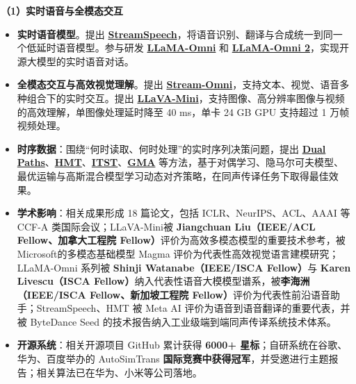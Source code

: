 \documentclass{resume}
\begin{document}

\vspace{2mm}

\textbf{\large \textcolor{red1}{（1）实时语音与全模态交互}}
\begin{itemize}[parsep=0.3ex]
\item \textbf{实时语音模型}。提出 \textbf{\href{https://arxiv.org/abs/2406.03049}{StreamSpeech}}，将语音识别、翻译与合成统一到同一个低延时语音模型。参与研发 \textbf{\href{https://arxiv.org/abs/2409.06666}{LLaMA-Omni}} 和 \textbf{\href{https://arxiv.org/abs/2505.02625}{LLaMA-Omni 2}}，实现开源大模型的实时语音对话。

\item \textbf{全模态交互与高效视觉理解}。提出 \textbf{\href{https://arxiv.org/pdf/2506.13642}{Stream-Omni}}，支持文本、视觉、语音多种组合下的实时交互。提出 \textbf{\href{https://arxiv.org/abs/2501.03895}{LLaVA-Mini}}，支持图像、高分辨率图像与视频的高效理解，单图像处理延时降至 40 ms，单卡 24 GB GPU 支持超过 1 万帧视频处理。

\item \textbf{时序数据}：围绕“何时读取、何时处理”的实时序列决策问题，提出 \textbf{\href{https://aclanthology.org/2022.acl-long.176/}{Dual Paths}}、\textbf{\href{https://openreview.net/forum?id=9y0HFvaAYD6}{HMT}}、\textbf{\href{https://aclanthology.org/2022.emnlp-main.65/}{ITST}}、\textbf{\href{https://aclanthology.org/2021.findings-emnlp.121/}{GMA}} 等方法，基于对偶学习、隐马尔可夫模型、最优运输与高斯混合模型学习动态对齐策略，在同声传译任务下取得最佳效果。

\item \textbf{\textcolor{red2}{学术影响}}：相关成果形成 18 篇论文，包括 ICLR、NeurIPS、ACL、AAAI 等 CCF-A 类国际会议；LLaVA-Mini被 \textbf{Jiangchuan Liu（IEEE/ACL Fellow、加拿大工程院 Fellow）}评价为高效多模态模型的重要技术参考，被Microsoft的多模态基础模型 Magma 评价为代表性高效视觉语言建模研究；LLaMA-Omni 系列被 \textbf{Shinji Watanabe（IEEE/ISCA Fellow）}与 \textbf{Karen Livescu（ISCA Fellow）}纳入代表性语音大模模型谱系，被\textbf{李海洲（IEEE/ISCA Fellow、新加坡工程院 Fellow）}评价为代表性前沿语音助手；StreamSpeech、HMT 被 Meta AI 评价为语音到语音翻译的重要代表，并被 ByteDance Seed 的技术报告纳入工业级端到端同声传译系统技术体系。

\item \textbf{\textcolor{red2}{开源系统}}：相关开源项目 GitHub 累计获得\textbf{ 6000+ 星标}；自研系统在谷歌、华为、百度举办的 AutoSimTrans \textbf{国际竞赛中获得冠军}，并受邀进行主题报告；相关算法已在华为、小米等公司落地。
\end{itemize}
\end{document}
